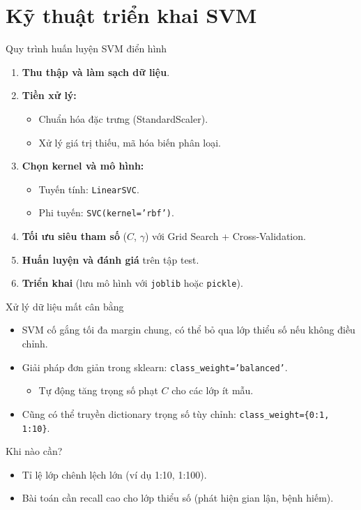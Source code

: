 
\section{Kỹ thuật triển khai SVM}

\begin{frame}{Quy trình huấn luyện SVM điển hình}
  \begin{enumerate}
    \item \textbf{Thu thập và làm sạch dữ liệu}.
    \item \textbf{Tiền xử lý:}
      \begin{itemize}
        \item Chuẩn hóa đặc trưng (StandardScaler).
        \item Xử lý giá trị thiếu, mã hóa biến phân loại.
      \end{itemize}
    \item \textbf{Chọn kernel và mô hình:}
      \begin{itemize}
        \item Tuyến tính: \texttt{LinearSVC}.
        \item Phi tuyến: \texttt{SVC(kernel='rbf')}.
      \end{itemize}
    \item \textbf{Tối ưu siêu tham số} ($C$, $\gamma$) với Grid Search + Cross‑Validation.
    \item \textbf{Huấn luyện và đánh giá} trên tập test.
    \item \textbf{Triển khai} (lưu mô hình với \texttt{joblib} hoặc \texttt{pickle}).
  \end{enumerate}
\end{frame}


\begin{frame}{Xử lý dữ liệu mất cân bằng}
  \begin{itemize}
    \item SVM cố gắng tối đa margin chung, có thể bỏ qua lớp thiểu số nếu không điều chỉnh.
    \item Giải pháp đơn giản trong sklearn: \texttt{class\_weight='balanced'}.
      \begin{itemize}
        \item Tự động tăng trọng số phạt $C$ cho các lớp ít mẫu.
      \end{itemize}
    \item Cũng có thể truyền dictionary trọng số tùy chỉnh: \texttt{class\_weight=\{0:1, 1:10\}}.
  \end{itemize}
  \begin{exampleblock}{Khi nào cần?}
    \begin{itemize}
      \item Tỉ lệ lớp chênh lệch lớn (ví dụ 1:10, 1:100).
      \item Bài toán cần recall cao cho lớp thiểu số (phát hiện gian lận, bệnh hiếm).
    \end{itemize}
  \end{exampleblock}
\end{frame}

